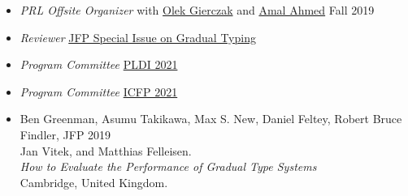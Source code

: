 \documentclass{article}
\begin{document}
\begin{itemize}
  \item \emph{PRL Offsite Organizer} with \href{https://www.khoury.northeastern.edu/people/olek-gierczak/}{Olek Gierczak} and \href{http://ccs.neu.edu/home/amal/}{Amal Ahmed} \hfill {Fall 2019}
  \item \emph{Reviewer} \hfill \href{https://www.cambridge.org/core/news/jfp-special-issue-on-gradual-typing}{JFP Special Issue on Gradual Typing}
  \item \emph{Program Committee} \hfill \href{https://pldi21.sigplan.org/committee/pldi-2021-papers-program-committee}{PLDI 2021}
  \item \emph{Program Committee} \hfill \href{https://icfp21.sigplan.org/committee/icfp-2021-papers-program-committee}{ICFP 2021}
\end{itemize}



\newpage
{}

\begin{itemize}
\item
  Ben Greenman, Asumu Takikawa, Max S. New, Daniel Feltey, Robert Bruce Findler, \hfill JFP 2019 \\
  Jan Vitek, and Matthias Felleisen. \\
  \emph{How to Evaluate the Performance of Gradual Type Systems} \\
  Cambridge, United Kingdom.
\end{itemize}
\end{document}
